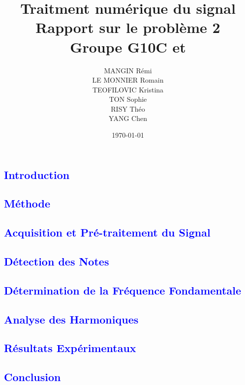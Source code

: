 \documentclass{article}
\title{Traitment numérique du signal \\ \vspace{5mm} Rapport sur le problème 2 \\ \vspace{3mm} Groupe G10C et }
\author{MANGIN Rémi \\
LE MONNIER Romain \\
TEOFILOVIC Kristina \\
TON Sophie \\
RISY Théo \\
YANG Chen}
\date{\today}
\begin{document}
\maketitle

\newpage
\tableofcontents
\newpage

\newpage
\textcolor{blue}{\section{Introduction}}

\textcolor{blue}{\section{Méthode}}

\textcolor{blue}{\subsection{Acquisition et Pré-traitement du Signal}}

\textcolor{blue}{\subsection{Détection des Notes}}

\textcolor{blue}{\subsection{Détermination de la Fréquence Fondamentale}}

\textcolor{blue}{\subsection{Analyse des Harmoniques}}

\newpage
\textcolor{blue}{\section{Résultats Expérimentaux}}

\newpage
\textcolor{blue}{\section{Conclusion}}

\end{document}
